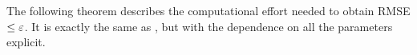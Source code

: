 

The following theorem describes the computational effort needed to obtain RMSE $\leq \varepsilon$. It is exactly the same as \cite[Theorem 1]{ClGiScTe:11}, but with the dependence on all the parameters explicit.%

